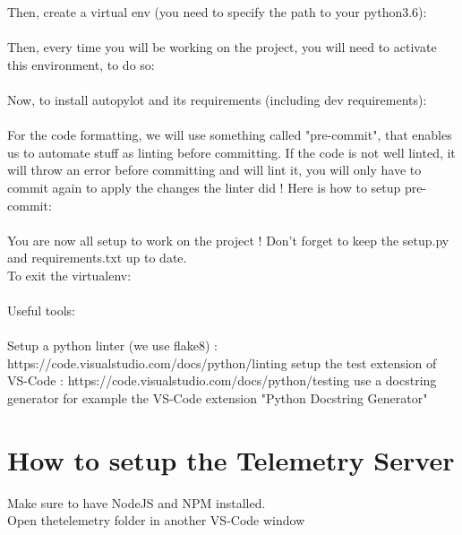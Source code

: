 \documentclass[12pt]{article}
\begin{document}
Then, create a virtual env (you need to specify the path to your python3.6):\\

\noindent{}\\

Then, every time you will be working on the project, you will need to activate this environment, to do so:\\

\noindent{}\\

Now, to install autopylot and its requirements (including dev requirements):\\

\noindent{}\\

For the code formatting, we will use something called "pre-commit", that enables us to automate stuff as linting before committing. If the code is not well linted, it will throw an error before committing and will lint it, you will only have to commit again to apply the changes the linter did ! Here is how to setup pre-commit:\\


\noindent{}\\

You are now all setup to work on the project ! Don't forget to keep the setup.py and requirements.txt up to date.\\

To exit the virtualenv:\\

\noindent{}\\

Useful tools:
\\\\
Setup a python linter (we use flake8) : https://code.visualstudio.com/docs/python/linting
setup the test extension of VS-Code : https://code.visualstudio.com/docs/python/testing
use a docstring generator for example the VS-Code extension "Python Docstring Generator"


\section{How to setup the Telemetry Server}
Make sure to have NodeJS and NPM installed.\\
Open thetelemetry folder in another VS-Code window\\
\end{document}
